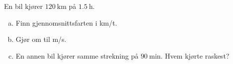 %
En bil kjører $\SI{120}{\kilo\metre}$ på $\SI{1.5}{\hour}$.
\begin{enumerate}[a)]
    \item Finn gjennomsnittsfarten i km/t.
    \item Gjør om til m/s.
    \item En annen bil kjører samme strekning på $\SI{90}{\minute}$. Hvem kjørte raskest?
\end{enumerate}
